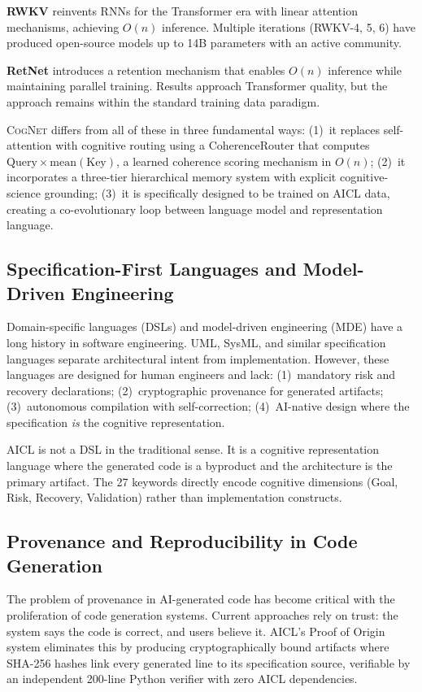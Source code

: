 \documentclass[11pt]{article}
\newcommand{\aicl}{\textsc{AICL}}
\newcommand{\cognet}{\textsc{CogNet}}
\newcommand{\proofoforigin}{Proof of Origin}
\begin{document}
\textbf{RWKV} \citep{peng2023rwkv} reinvents RNNs for the Transformer era with linear attention mechanisms, achieving $O(n)$ inference. Multiple iterations (RWKV-4, 5, 6) have produced open-source models up to 14B parameters with an active community.

\textbf{RetNet} \citep{sun2023retnet} introduces a retention mechanism that enables $O(n)$ inference while maintaining parallel training. Results approach Transformer quality, but the approach remains within the standard training data paradigm.

\cognet{} differs from all of these in three fundamental ways: (1)~it replaces self-attention with cognitive routing using a CoherenceRouter that computes $\text{Query} \times \text{mean}(\text{Key})$, a learned coherence scoring mechanism in $O(n)$; (2)~it incorporates a three-tier hierarchical memory system with explicit cognitive-science grounding; (3)~it is specifically designed to be trained on \aicl{} data, creating a co-evolutionary loop between language model and representation language.

\subsection{Specification-First Languages and Model-Driven Engineering}

Domain-specific languages (DSLs) and model-driven engineering (MDE) have a long history in software engineering. UML, SysML, and similar specification languages separate architectural intent from implementation. However, these languages are designed for human engineers and lack: (1)~mandatory risk and recovery declarations; (2)~cryptographic provenance for generated artifacts; (3)~autonomous compilation with self-correction; (4)~AI-native design where the specification \emph{is} the cognitive representation.

\aicl{} is not a DSL in the traditional sense. It is a cognitive representation language where the generated code is a byproduct and the architecture is the primary artifact. The 27 keywords directly encode cognitive dimensions (Goal, Risk, Recovery, Validation) rather than implementation constructs.

\subsection{Provenance and Reproducibility in Code Generation}

The problem of provenance in AI-generated code has become critical with the proliferation of code generation systems. Current approaches rely on trust: the system says the code is correct, and users believe it. \aicl{}'s \proofoforigin{} system \citep{philippeantoine2026noorphan} eliminates this by producing cryptographically bound artifacts where SHA-256 hashes link every generated line to its specification source, verifiable by an independent 200-line Python verifier with zero \aicl{} dependencies.
\end{document}
